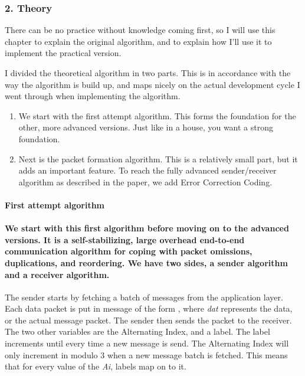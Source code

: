 \subsubsection{2. Theory}\label{theory}

There can be no practice without knowledge coming first, so I will use
this chapter to explain the original algorithm, and to explain how I'll use it to
implement the practical version.

I divided the theoretical algorithm in two parts. This is in accordance
with the way the algorithm is build up, and maps nicely on the actual
development cycle I went through when implementing the algorithm.

\begin{enumerate}
\def\labelenumi{\arabic{enumi}.}
\itemsep1pt\parskip0pt
\item
  We start with the first attempt algorithm. This forms the foundation
  for the other, more advanced versions. Just like in a house, you want
  a strong foundation.
\item
  Next is the packet formation algorithm. This is a relatively small
  part, but it adds an important feature. To reach the fully advanced
  sender/receiver algorithm as described in the paper, we add Error
  Correction Coding.
\end{enumerate}

\paragraph{First attempt algorithm\\\\We start with this first algorithm
before moving on to the advanced versions. It is a self-stabilizing,
large overhead end-to-end communication algorithm for coping with packet
omissions, duplications, and reordering. We have two sides, a sender
algorithm and a receiver
algorithm.}\label{first-attempt-algorithm-we-start-with-this-first-algorithm-before-moving-on-to-the-advanced-versions.-it-is-a-self-stabilizing-large-overhead-end-to-end-communication-algorithm-for-coping-with-packet-omissions-duplications-and-reordering.-we-have-two-sides-a-sender-algorithm-and-a-receiver-algorithm.}

The sender starts by fetching a batch of messages from the application
layer. Each data packet is put in message of the form \textbf{}, where
\emph{dat} represents the data, or the actual message packet. The sender
then sends the packet to the receiver. The two other variables are the
Alternating Index, and a label. The label increments until \emph{} every
time a new message is send. The Alternating Index will only increment in
modulo 3 when a new message batch is fetched. This means that for every
value of the \emph{Ai}, \emph{} labels map on to it.

